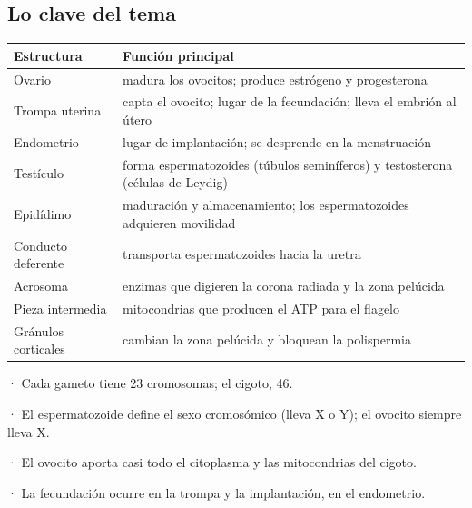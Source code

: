 \subsection{Lo clave del tema}
\begin{center}\small
\begin{tabularx}{\linewidth}{@{}>{\raggedright\arraybackslash\hsize=0.64\hsize}X>{\raggedright\arraybackslash\hsize=1.36\hsize}X@{}}
\toprule
\textbf{Estructura} & \textbf{Función principal} \\
\midrule
Ovario & madura los ovocitos; produce estrógeno y progesterona \\
Trompa uterina & capta el ovocito; lugar de la fecundación; lleva el embrión al útero \\
Endometrio & lugar de implantación; se desprende en la menstruación \\
Testículo & forma espermatozoides (túbulos seminíferos) y testosterona (células de Leydig) \\
Epidídimo & maduración y almacenamiento; los espermatozoides adquieren movilidad \\
Conducto deferente & transporta espermatozoides hacia la uretra \\
Acrosoma & enzimas que digieren la corona radiada y la zona pelúcida \\
Pieza intermedia & mitocondrias que producen el ATP para el flagelo \\
Gránulos corticales & cambian la zona pelúcida y bloquean la polispermia \\
\bottomrule
\end{tabularx}
\end{center}
 
\begin{clave}[{Recuerda}] · Cada gameto tiene 23 cromosomas; el cigoto, 46.\par · El espermatozoide define el sexo cromosómico (lleva X o Y); el ovocito siempre lleva X.\par · El ovocito aporta casi todo el citoplasma y las mitocondrias del cigoto.\par · La fecundación ocurre en la trompa y la implantación, en el endometrio.\end{clave}
 
